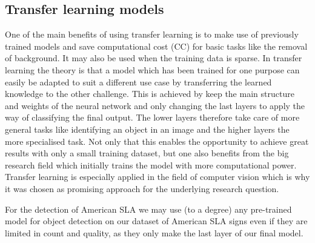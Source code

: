 \subsection{Transfer learning models}\label{chapter_models}
One of the main benefits of using transfer learning is to make use of previously trained models and save computational cost (CC) for basic tasks like the removal of background. It may also be used when the training data is sparse. In transfer learning the theory is that a model which has been trained for one purpose can easily be adapted to suit a different use case by transferring the learned knowledge to the other challenge\cite{zhuang2020comprehensive}. This is achieved by keep the main structure and weights of the neural network and only changing the last layers to apply the way of classifying the final output. The lower layers therefore take care of more general tasks like identifying an object in an image\cite{neyshabur2021transferred} and the higher layers the more specialised task. Not only that this enables the opportunity to achieve great results with only a small training dataset, but one also benefits from the big research field which initially trains the model with more computational power. Transfer learning is especially applied in the field of computer vision which is why it was chosen as promising approach for the underlying research question.

For the detection of American SLA we may use (to a degree) any pre-trained model for object detection on our dataset of American SLA signs even if they are limited in count and quality, as they only make the last layer of our final model.

